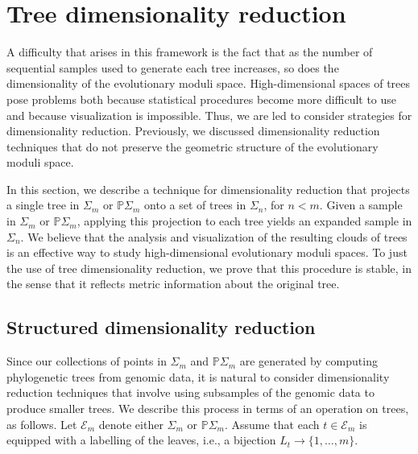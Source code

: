 \documentclass[a4paper,11pt]{article}
\newcommand{\aE}{\mathcal{E}}
\begin{document}

\section{Tree dimensionality reduction}\label{sec:treedimred}

A difficulty that arises in this framework is the fact that as the number of sequential samples used to generate each tree increases, so does the dimensionality of the evolutionary moduli space.
High-dimensional spaces of trees pose problems both because statistical procedures become more difficult to use and because visualization is impossible.
Thus, we are led to consider strategies for dimensionality reduction.
Previously, we discussed dimensionality reduction techniques that do not preserve the geometric structure of the evolutionary moduli space.

In this section, we describe a technique for dimensionality reduction that projects a single tree in $\Sigma_m$ or $\mathbb{P}\Sigma_m$ onto a set of trees in $\Sigma_{n}$, for $n < m$.
Given a sample in $\Sigma_m$ or $\mathbb{P}\Sigma_m$, applying this projection to each tree yields an expanded sample in $\Sigma_n$.
We believe that the analysis and visualization of the resulting clouds of trees is an effective way to study high-dimensional evolutionary moduli spaces.
To just the use of tree dimensionality reduction, we prove that this procedure is stable, in the sense that it reflects metric information about the original tree.

\subsection{Structured dimensionality reduction}

Since our collections of points in $\Sigma_m$ and $\mathbb{P}\Sigma_m$ are generated by computing phylogenetic trees from genomic data, it is natural to consider dimensionality reduction techniques that involve using subsamples of the genomic data to produce smaller trees.
We describe this process in terms of an operation on trees, as follows.
Let $\aE_m$ denote either $\Sigma_m$ or $\mathbb{P}\Sigma_m$.
Assume that each $t \in \aE_m$ is equipped with a labelling of the leaves, i.e., a bijection $L_t \to \{1,\ldots,m\}$.
\end{document}
